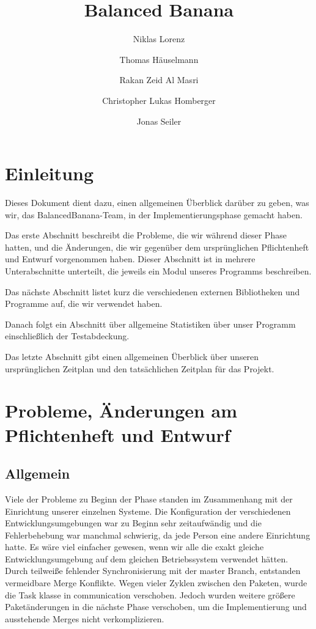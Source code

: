 \documentclass[a4paper,12pt]{article}
\title{Balanced Banana}
\author{Niklas Lorenz \and Thomas Häuselmann \and Rakan Zeid Al Masri \and Christopher Lukas Homberger \and Jonas Seiler}
\begin{document}
\setcounter{page}{2}
\tableofcontents          %
\clearpage
{}

\section{Einleitung}
\vspace{0.2cm}
Dieses Dokument dient dazu, einen allgemeinen Überblick darüber zu geben, was wir, das BalancedBanana-Team, in der Implementierungsphase gemacht haben. \par
\vspace{5mm}

Das erste Abschnitt beschreibt die Probleme, die wir während dieser Phase hatten, und die Änderungen, die wir gegenüber dem ursprünglichen Pflichtenheft und Entwurf vorgenommen haben. Dieser Abschnitt ist in mehrere Unterabschnitte unterteilt, die jeweils ein Modul unseres Programms beschreiben.\par 
\vspace{5mm}

Das nächste Abschnitt listet kurz die verschiedenen externen Bibliotheken und Programme auf, die wir verwendet haben.\par 
\vspace{5mm}

Danach folgt ein Abschnitt über allgemeine Statistiken über unser Programm einschließlich der Testabdeckung.\par
\vspace{5mm}

Das letzte Abschnitt gibt einen allgemeinen Überblick über unseren ursprünglichen Zeitplan und den tatsächlichen Zeitplan für das Projekt.

\clearpage
\section{Probleme, Änderungen am Pflichtenheft und Entwurf}
\subsection{Allgemein}
\vspace{0.2cm}
Viele der Probleme zu Beginn der Phase standen im Zusammenhang mit der Einrichtung unserer einzelnen Systeme. Die Konfiguration der verschiedenen Entwicklungsumgebungen war zu Beginn sehr zeitaufwändig und die Fehlerbehebung war manchmal schwierig, da jede Person eine andere Einrichtung hatte. Es wäre viel einfacher gewesen, wenn wir alle die exakt gleiche Entwicklungsumgebung auf dem gleichen Betriebssystem verwendet hätten.
Durch teilweiße fehlender Synchronisierung mit der master Branch, entstanden vermeidbare Merge Konflikte.
Wegen vieler Zyklen zwischen den Paketen, wurde die Task klasse in communication verschoben.
Jedoch wurden weitere größere Paketänderungen in die nächste Phase verschoben, um die Implementierung und ausstehende Merges nicht verkomplizieren.
\clearpage
\end{document}
